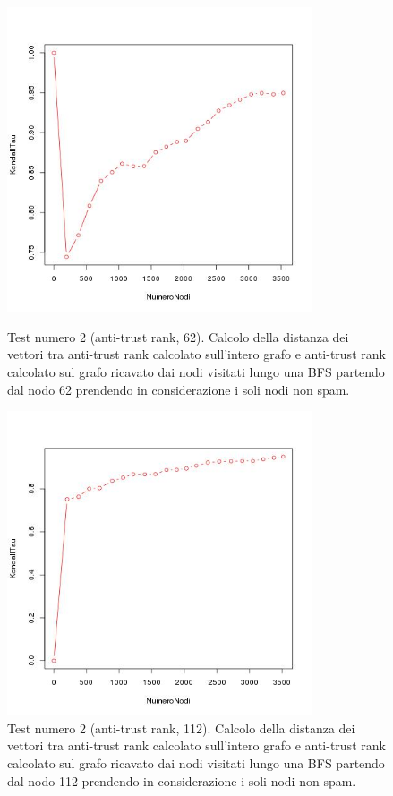 \begin{figure}
\centering
 \includegraphics[height=9cm]{immagini/test2/antiTrustraktGoodNodesTestMode1_62}
 \caption{Test numero 2 (anti-trust rank, 62). Calcolo della distanza dei vettori tra anti-trust rank calcolato sull'intero grafo e anti-trust rank calcolato sul grafo ricavato dai nodi visitati lungo una BFS partendo dal nodo 62 prendendo in considerazione i soli nodi non spam. }
 \label{fig:test2antitrustModoB62}
\centering
 \includegraphics[height=9cm]{immagini/test2/antiTrustraktGoodNodesTestMode1_112}
 \caption{Test numero 2 (anti-trust rank, 112). Calcolo della distanza dei vettori tra anti-trust rank calcolato sull'intero grafo e anti-trust rank calcolato sul grafo ricavato dai nodi visitati lungo una BFS partendo dal nodo 112 prendendo in considerazione i soli nodi non spam. }
 \label{fig:test2antitrustModoB112}
\end{figure}

